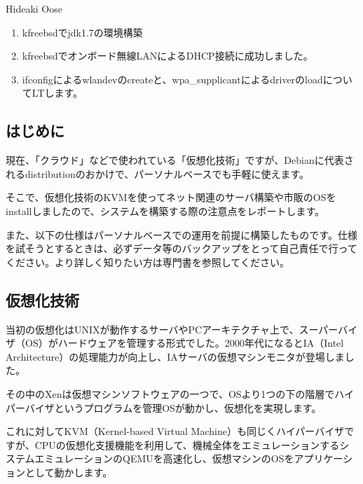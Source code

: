 \documentclass[mingoth,a4paper]{jsarticle}
\begin{document}
\begin{prework}{ Hideaki Oose }

 \begin{enumerate}
  \item kfreebsdでjdk1.7の環境構築
  \item kfreebsdでオンボード無線LANによるDHCP接続に成功しました。
  \item ifconfigによるwlandevのcreateと、wpa\_supplicantによるdriverのloadについてLTします。
 \end{enumerate}

\end{prework}


\subsection{はじめに}
現在、「クラウド」などで使われている「仮想化技術」ですが、Debianに代表されるdistributionのおかけで、パーソナルベースでも手軽に使えます。

そこで、仮想化技術のKVMを使ってネット関連のサーバ構築や市販のOSをinstallしましたので、システムを構築する際の注意点をレポートします。

また、以下の仕様はパーソナルベースでの運用を前提に構築したものです。仕様を試そうとするときは、必ずデータ等のバックアップをとって自己責任で行ってください。より詳しく知りたい方は専門書を参照してください。

\subsection{仮想化技術}
当初の仮想化はUNIXが動作するサーバやPCアーキテクチャ上で、スーパーバイザ（OS）がハードウェアを管理する形式でした。2000年代になるとIA（Intel Architecture）の処理能力が向上し、IAサーバの仮想マシンモニタが登場しました。

その中のXenは仮想マシンソフトウェアの一つで、OSより1つの下の階層でハイパーバイザというプログラムを管理OSが動かし、仮想化を実現します。

これに対してKVM（Kernel-based Virtual Machine）も同じくハイパーバイザですが、CPUの仮想化支援機能を利用して、機械全体をエミュレーションするシステムエミュレーションのQEMUを高速化し、仮想マシンのOSをアプリケーションとして動かします。
\end{document}

